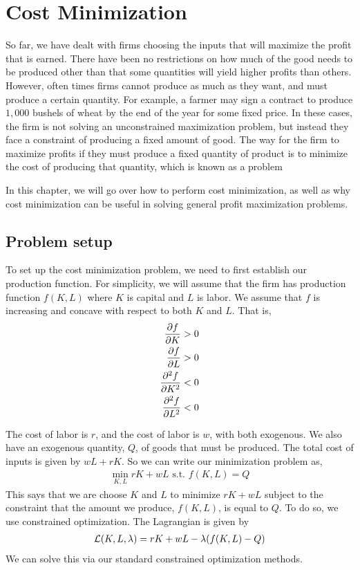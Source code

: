 \chapter{Cost Minimization}
So far, we have dealt with firms choosing the inputs that will maximize the profit that is earned. There have been no restrictions on how much of the good needs to be produced other than that some quantities will yield higher profits than others. However, often times firms cannot produce as much as they want, and must produce a certain quantity. For example, a farmer may sign a contract to produce $1,000$ bushels of wheat by the end of the year for some fixed price. In these cases, the firm is not solving an unconstrained maximization problem, but instead they face a constraint of producing a fixed amount of good. The way for the firm to maximize profits if they must produce a fixed quantity of product is to minimize the cost of producing that quantity, which is known as a  problem

In this chapter, we will go over how to perform cost minimization, as well as why cost minimization can be useful in solving general profit maximization problems. 

\section{Problem setup}
To set up the cost minimization problem, we need to first establish our production function. For simplicity, we will assume that the firm has production function $f(K, L)$ where $K$ is capital and $L$ is labor. We assume that $f$ is increasing and concave with respect to both $K$ and $L$. That is,
\begin{align*}
    \frac{\partial f}{\partial K} &> 0 \\
    \frac{\partial f}{\partial L} &> 0 \\ 
    \frac{\partial^2 f}{\partial K^2} &< 0 \\
    \frac{\partial^2 f}{\partial L^2} &< 0
\end{align*}

The cost of labor is $r$, and the cost of labor is $w$, with both exogenous. We also have an exogenous quantity, $Q$, of goods that must be produced. The total cost of inputs is given by $wL + rK$. So we can write our minimization problem as,
\begin{align*}
    \min_{K, L} rK  + wL \text{ s.t. } f(K, L) = Q
\end{align*}
This says that we are choose $K$ and $L$ to minimize $rK + wL$ subject to the constraint that the amount we produce, $f(K, L)$, is equal to $Q$. To do so, we use constrained optimization. The Lagrangian is given by
\begin{align*}
    \mathcal{L}(K, L, \lambda) = rK + wL - \lambda(f(K, L) - Q)
\end{align*}
We can solve this via our standard constrained optimization methods.

